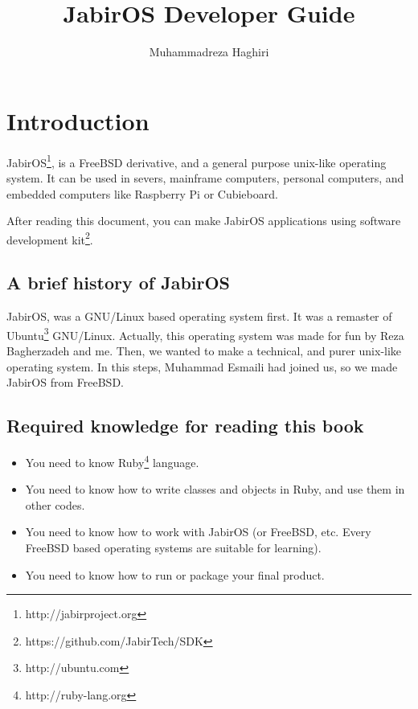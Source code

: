 \documentclass[11pt]{article}
\title{JabirOS Developer Guide}
\author{Muhammadreza Haghiri}
\begin{document}
\maketitle
\newpage{}
\tableofcontents
\newpage{}
\section{Introduction}
JabirOS\footnote{http://jabirproject.org}, is a FreeBSD derivative, and a general purpose unix-like operating system. It can be used in severs, mainframe computers, personal computers, and embedded computers like Raspberry Pi or Cubieboard.

After reading this document, you can make JabirOS applications using software development kit\footnote{https://github.com/JabirTech/SDK}. 

\subsection{A brief history of JabirOS}
JabirOS, was a GNU/Linux based operating system first. It was a remaster of Ubuntu\footnote{http://ubuntu.com} GNU/Linux. Actually, this operating system was made for fun by Reza Bagherzadeh and me. Then, we wanted to make a technical, and purer unix-like operating system. In this steps, Muhammad Esmaili had joined us, so we made JabirOS from FreeBSD. 

\subsection{Required knowledge for reading this book}
\begin{itemize}
\item You need to know Ruby\footnote{http://ruby-lang.org} language.
\item You need to know how to write classes and objects in Ruby, and use them in other codes. 
\item You need to know how to work with JabirOS (or FreeBSD, etc. Every FreeBSD based operating systems are suitable for learning). 
\item You need to know how to run or package your final product. 
\end{itemize}
\end{document}
